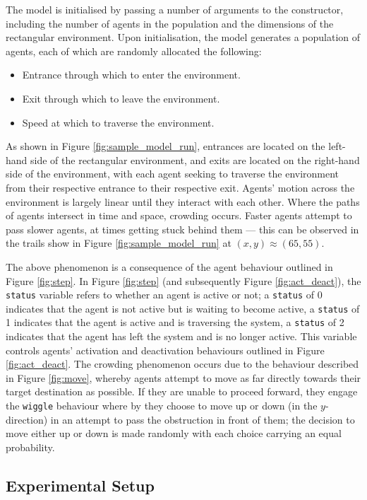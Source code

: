 The model is initialised by passing a number of arguments to the constructor,
including the number of agents in the population and the dimensions of the
rectangular environment.
Upon initialisation, the model generates a population of agents, each of which
are randomly allocated the following:
\begin{itemize}
    \item Entrance through which to enter the environment.
    \item Exit through which to leave the environment.
    \item Speed at which to traverse the environment.
\end{itemize}
As shown in Figure \ref{fig:sample_model_run}, entrances are located on the
left-hand side of the rectangular environment, and exits are located on the
right-hand side of the environment, with each agent seeking to traverse the
environment from their respective entrance to their respective exit.
Agents' motion across the environment is largely linear until they interact with
each other.
Where the paths of agents intersect in time and space, crowding occurs.
Faster agents attempt to pass slower agents, at times getting stuck behind them
--- this can be observed in the trails show in Figure \ref{fig:sample_model_run}
at $(x, y) \approx (65, 55)$.

The above phenomenon is a consequence of the agent behaviour outlined in Figure
\ref{fig:step}.
In Figure \ref{fig:step} (and subsequently Figure \ref{fig:act_deact}), the
\texttt{status} variable refers to whether an agent is active or not; a
\texttt{status} of 0 indicates that the agent is not active but is waiting to
become active, a \texttt{status} of 1 indicates that the agent is active and is
traversing the system, a \texttt{status} of 2 indicates that the agent has left
the system and is no longer active.
This variable controls agents' activation and deactivation behaviours outlined
in Figure \ref{fig:act_deact}.
The crowding phenomenon occurs due to the behaviour described in Figure
\ref{fig:move}, whereby agents attempt to move as far directly towards their
target destination as possible.
If they are unable to proceed forward, they engage the \texttt{wiggle} behaviour
where by they choose to move up or down (in the $y$-direction) in an attempt to
pass the obstruction in front of them; the decision to move either up or down is
made randomly with each choice carrying an equal probability.

\subsection{Experimental Setup}\label{sub:research:experiments}

